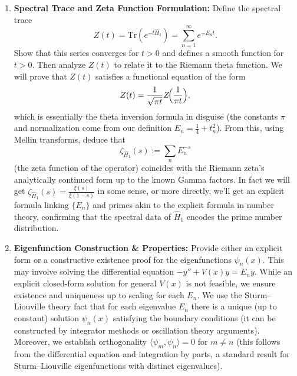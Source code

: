 \documentclass[12pt]{article}
\theoremstyle{plain}
\theoremstyle{definition}
\begin{document}
\begin{enumerate}[label=(\roman*)]
    \item \textbf{Spectral Trace and Zeta Function Formulation:} Define the spectral trace
    \[
    Z(t) = \mathrm{Tr}(e^{-t\hat{H}_1}) = \sum_{n=1}^\infty e^{-E_n t}.
    \]
    Show that this series converges for \(t>0\) and defines a smooth function for \(t>0\). Then analyze \(Z(t)\) to relate it to the Riemann theta function. We will prove that \(Z(t)\) satisfies a functional equation of the form 
    \[
    Z(t) = \frac{1}{\sqrt{\pi t}} Z\!\Bigl(\frac{1}{\pi t}\Bigr),
    \]
    which is essentially the theta inversion formula in disguise (the constants \(\pi\) and normalization come from our definition \(E_n = \frac{1}{4}+t_n^2\)). From this, using Mellin transforms, deduce that 
    \[
    \zeta_{\hat{H}_1}(s) := \sum_{n} E_n^{-s}
    \]
    (the zeta function of the operator) coincides with the Riemann zeta's analytically continued form up to the known Gamma factors. In fact we will get \(\zeta_{\hat{H}_1}(s) = \frac{\xi(s)}{\xi(1-s)}\) in some sense, or more directly, we’ll get an explicit formula linking \(\{E_n\}\) and primes akin to the explicit formula in number theory, confirming that the spectral data of \(\hat{H}_1\) encodes the prime number distribution.
    
    \item \textbf{Eigenfunction Construction \& Properties:} Provide either an explicit form or a constructive existence proof for the eigenfunctions \(\psi_n(x)\). This may involve solving the differential equation \(-y'' + V(x)y = E_n y\). While an explicit closed-form solution for general \(V(x)\) is not feasible, we ensure existence and uniqueness up to scaling for each \(E_n\). We use the Sturm--Liouville theory fact that for each eigenvalue \(E_n\) there is a unique (up to constant) solution \(\psi_n(x)\) satisfying the boundary conditions (it can be constructed by integrator methods or oscillation theory arguments). Moreover, we establish orthogonality \(\langle \psi_m, \psi_n\rangle = 0\) for \(m\neq n\) (this follows from the differential equation and integration by parts, a standard result for Sturm--Liouville eigenfunctions with distinct eigenvalues).
\end{enumerate}
\end{document}
